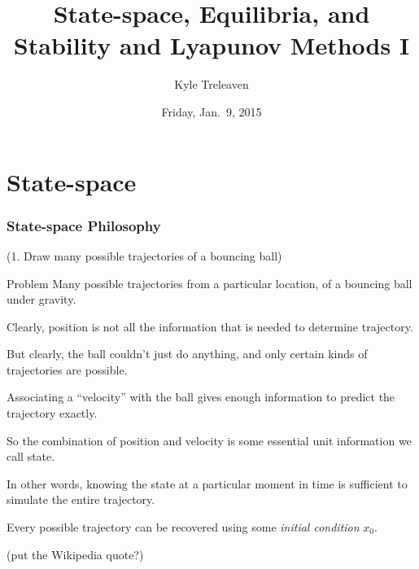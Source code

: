 \documentclass[12pt]{beamer}
\author{Kyle Treleaven}
\title{State-space, Equilibria, and Stability and Lyapunov Methods I}
\date{Friday, Jan.~9, 2015}
\begin{document}
\begin{frame}
\titlepage

\end{frame}





\section{State-space}

\begin{frame}
\frametitle{State-space Philosophy}

(1. Draw many possible trajectories of a bouncing ball)

\begin{block}{Problem}
Many possible trajectories from a particular location, of a bouncing ball under gravity.
\end{block}


\end{frame}


\begin{frame}

\begin{itemize}

\vitem Clearly, position is not all the information that is needed to determine trajectory.

\vitem But clearly, the ball couldn't just do anything, and only certain kinds of trajectories are possible.

\end{itemize}

\end{frame}



\begin{frame}
\begin{itemize}
\vitem Associating a ``velocity'' with the ball gives enough information to predict the trajectory exactly.

\vitem So the combination of position and velocity is some essential unit information we call state.

\vitem In other words, knowing the state at a particular moment in time is sufficient to simulate the entire trajectory.

\vitem Every possible trajectory can be recovered using some \emph{initial condition} $x_0$.
\end{itemize}

(put the Wikipedia quote?)

\vfill\null

\end{frame}
\end{document}
